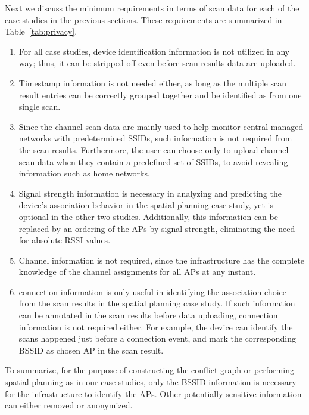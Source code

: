 Next we discuss the minimum requirements in terms of scan data for each of the
case studies in the previous sections. These requirements are summarized in
Table~\ref{tab:privacy}.

\begin{enumerate}
  \item For all case studies, device identification information is not
    utilized in any way; thus, it can be stripped off even before scan
    results data are uploaded.
  \item Timestamp information is not needed either, as long as the multiple
    scan result entries can be correctly grouped together and be identified as
    from one single scan.
  \item Since the channel scan data are mainly used to help monitor central
    managed networks with predetermined SSIDs, such information is not required
    from the scan results. Furthermore, the user can choose only to upload
    channel scan data when they contain a predefined set of SSIDs, to avoid
    revealing information such as home \wifi{} networks. 
  \item Signal strength information is necessary in analyzing and predicting
    the device's association behavior in the spatial planning case study, yet
    is optional in the other two studies. Additionally, this information can be
    replaced by an ordering of the APs by signal strength, eliminating the need
    for absolute RSSI values.
  \item Channel information is not required, since the infrastructure has the
    complete knowledge of the channel assignments for all APs at any instant.
  \item \wifi{} connection information is only useful in identifying the
    association choice from the scan results in the spatial planning case
    study. If such information can be annotated in the scan results before data
    uploading, \wifi{} connection information is not required either. For
    example, the device can identify the scans happened just before a \wifi{}
    connection event, and mark the corresponding BSSID as chosen AP in the scan
    result.
\end{enumerate}

To summarize, for the purpose of constructing the conflict graph or performing
spatial planning as in our case studies, only the BSSID information is necessary
for the infrastructure to identify the APs. Other potentially sensitive
information can either removed or anonymized.

